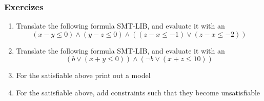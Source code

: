 \begin{frame}
  \frametitle{Exercizes}

  \begin{enumerate}
    \item Translate the following \Lia formula SMT-LIB, and evaluate it with an \smtsolver
    $$(x - y \leq 0) \wedge (y - z \leq 0) \wedge ((z - x \leq -1) \vee (z - x \leq -2))$$
    \vfill

    \item Translate the following \Lra formula SMT-LIB, and evaluate it with an \smtsolver
    $$(b \vee (x + y \leq 0)) \wedge (\neg b \vee (x + z \leq 10))$$
    \vfill

    \item For the satisfiable \formulae above print out a model
    \vfill

    \item For the satisfiable \formulae above, add constraints such that they become unsatisfiable

  \end{enumerate}

\end{frame}
